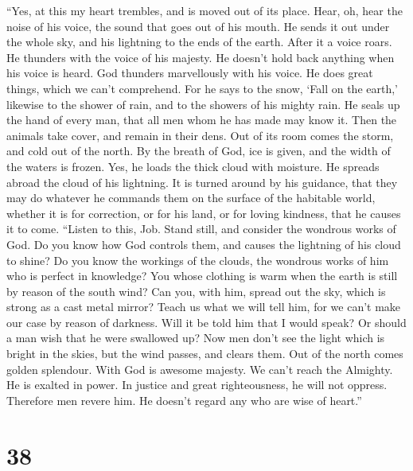  ``Yes, at this my heart trembles, and is moved out of its
place.  Hear, oh, hear the noise of his voice, the sound
that goes out of his mouth.  He sends it out under the
whole sky, and his lightning to the ends of the earth. 
After it a voice roars. He thunders with the voice of his majesty. He
doesn't hold back anything when his voice is heard.  God
thunders marvellously with his voice. He does great things, which we
can't comprehend.  For he says to the snow, `Fall on the
earth,' likewise to the shower of rain, and to the showers of his mighty
rain.  He seals up the hand of every man, that all men
whom he has made may know it.  Then the animals take
cover, and remain in their dens.  Out of its room comes
the storm, and cold out of the north.  By the breath of
God, ice is given, and the width of the waters is frozen.
 Yes, he loads the thick cloud with moisture. He spreads
abroad the cloud of his lightning.  It is turned around
by his guidance, that they may do whatever he commands them on the
surface of the habitable world,  whether it is for
correction, or for his land, or for loving kindness, that he causes it
to come.  ``Listen to this, Job. Stand still, and
consider the wondrous works of God.  Do you know how God
controls them, and causes the lightning of his cloud to shine?
 Do you know the workings of the clouds, the wondrous
works of him who is perfect in knowledge?  You whose
clothing is warm when the earth is still by reason of the south wind?
 Can you, with him, spread out the sky, which is strong
as a cast metal mirror?  Teach us what we will tell him,
for we can't make our case by reason of darkness.  Will
it be told him that I would speak? Or should a man wish that he were
swallowed up?  Now men don't see the light which is
bright in the skies, but the wind passes, and clears them.
 Out of the north comes golden splendour. With God is
awesome majesty.  We can't reach the Almighty. He is
exalted in power. In justice and great righteousness, he will not
oppress.  Therefore men revere him. He doesn't regard any
who are wise of heart.''

\hypertarget{section-37}{%
\section{38}\label{section-37}}

